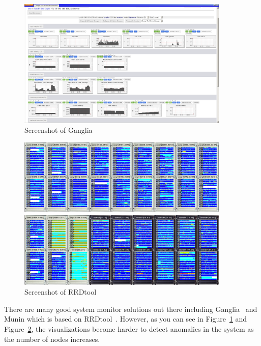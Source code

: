 \documentclass[conference]{style/acmsiggraph}
\begin{document}
\begin{figure}[p]
    \centering
    \includegraphics[width=0.9\textwidth]{images/ganglia.png}
    \caption{Screenshot of Ganglia\protect\footnotemark}
    \label{fig:ganglia}
\end{figure}
\begin{figure}[p]
    \centering
    \includegraphics[width=0.9\textwidth]{images/rrdtool.png}
    \caption{Screenshot of RRDtool\protect\footnotemark}
    \label{fig:rrdtool}
\end{figure}

There are many good system monitor solutions out there including Ganglia~\cite{Massie04} and Munin
which is based on RRDtool~\cite{Oetiker99}. However, as you can see in Figure~\ref{fig:ganglia} and
Figure~\ref{fig:rrdtool}, the visualizations become harder to detect anomalies in the system as the
number of nodes increases.
\end{document}
